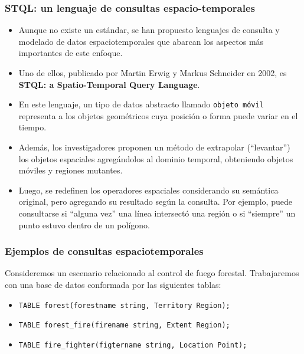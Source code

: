 \begin{frame}
\frametitle{STQL: un lenguaje de consultas espacio-temporales}
\begin{itemize}

	\item	Aunque no existe un estándar, se han propuesto lenguajes de
	consulta y modelado de datos espaciotemporales que abarcan los aspectos
	más importantes de este enfoque. \pause

	\item	Uno de ellos, publicado por Martin Erwig y Markus Schneider en 2002,
	es \textbf{STQL: a Spatio-Temporal Query Language}. \pause

	\item	En este lenguaje, un tipo de datos abstracto llamado
	\texttt{objeto móvil} representa a los objetos geométricos cuya posición
	o forma puede variar en el tiempo. \pause

	\item	Además, los investigadores proponen un método de extrapolar
	(``levantar'') los objetos espaciales agregándolos al dominio
	temporal, obteniendo objetos móviles y regiones mutantes. \pause

	\item	Luego, se redefinen los operadores espaciales considerando su
	semántica original, pero agregando su resultado según la consulta.
	Por ejemplo, puede consultarse si ``alguna vez'' una línea intersectó
	una región o si ``siempre'' un punto estuvo dentro de un polígono.
\end{itemize}
\end{frame}

\begin{frame}
	\frametitle{Ejemplos de consultas espaciotemporales}
	Consideremos un escenario relacionado al control de fuego forestal.
	Trabajaremos con una base de datos conformada por las siguientes
	tablas:

	\begin{itemize}
	\item \texttt{TABLE forest(forestname string, Territory Region);}

	\item \texttt{TABLE forest\_fire(firename string, Extent Region);}

	\item \texttt{TABLE fire\_fighter(figtername string, Location Point);}
	\end{itemize}

\end{frame}

